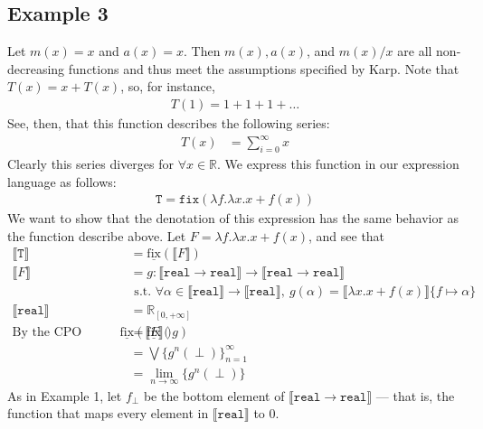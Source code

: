 \documentclass{westhesis}
\newcommand{\R}{\mathbb{R}}
\begin{document}
 \subsection{Example 3} Let $m(x) = x$ and $a(x) = x$. Then $m(x), a(x)$, and $m(x)/x$ are all non-decreasing functions and thus meet the assumptions specified by Karp. Note that $T(x) = x + T(x)$, so, for instance,
\begin{align*}
T(1) = 1 + 1 + 1 + \ldots
\end{align*}
See, then, that this function describes the following series:
\begin{align*}
T(x) &= \sum_{i=0}^{\infty} x 
\end{align*}
Clearly this series diverges for $\forall x \in \R$. We express this function in our expression language as follows:
\begin{align*}
 \texttt{T} = \texttt{fix}(\lambda f. \lambda x.x + f(x))
 \end{align*}
 We want to show that the denotation of this expression has the same behavior as the function describe above. Let $F = \lambda f. \lambda x.x + f (x)$, and see that 
 \begin{align*}
 \llbracket \texttt{T} \rrbracket &= \underline{\text{fix}}(\llbracket F \rrbracket) \\
 \llbracket F \rrbracket &= g : \llbracket \texttt{real} \rightarrow \texttt{real}\rrbracket \rightarrow \llbracket \texttt{real} \rightarrow \texttt{real}\rrbracket \\ &\text{ \ \ \ s.t. } \forall \alpha \in \llbracket \texttt{real}\rrbracket \rightarrow \llbracket \texttt{real}\rrbracket, \ 
 g(\alpha) = \llbracket \lambda x.x + f (x)\rrbracket\{f \mapsto \alpha\} \\
 \llbracket \texttt{real}\rrbracket &= \R_{[0, +\infty]}  
 \\\text{By the CPO fixpoint theorem, } \underline{\text{fix}}(\llbracket F \rrbracket) &= \underline{\text{fix}}(g) \\
&= \bigvee\{g^n (\perp)\}^{\infty}_{n=1} \\
&= \lim_{n \to \infty}\{g^n (\perp)\}
 \end{align*}
As in Example 1, let $f_{\perp}$ be the bottom element of $\llbracket \texttt{real} \rightarrow \texttt{real} \rrbracket$ --- that is, 
the function that maps every element in $\llbracket \texttt{real} \rrbracket$ to $0$. 
\end{document}

